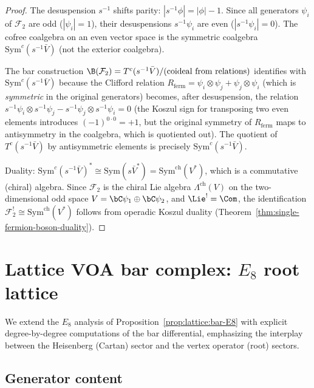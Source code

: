 \begin{proof}
The desuspension $s^{-1}$ shifts parity:
$|s^{-1}\phi| = |\phi| - 1$.  Since all generators $\psi_i$ of
$\mathcal{F}_2$ are odd ($|\psi_i| = 1$), their desuspensions
$s^{-1}\psi_i$ are even ($|s^{-1}\psi_i| = 0$).  The cofree
coalgebra on an even vector space is the symmetric coalgebra
$\mathrm{Sym}^c(s^{-1}\bar{V})$ (not the exterior coalgebra).

The bar construction $\B(\mathcal{F}_2) = T^c(s^{-1}\bar{V})
/\text{(coideal from relations)}$ identifies with
$\mathrm{Sym}^c(s^{-1}\bar{V})$ because the Clifford
relation $R_{\mathrm{ferm}} = \psi_i \otimes \psi_j + \psi_j \otimes \psi_i$
(which is \emph{symmetric} in the original generators) becomes, after
desuspension, the relation $s^{-1}\psi_i \otimes s^{-1}\psi_j
- s^{-1}\psi_j \otimes s^{-1}\psi_i = 0$
(the Koszul sign for transposing two even elements introduces
$(-1)^{0 \cdot 0} = +1$, but the original symmetry of $R_{\mathrm{ferm}}$
maps to antisymmetry in the coalgebra, which is quotiented out).
The quotient of $T^c(s^{-1}\bar{V})$ by antisymmetric elements
is precisely $\mathrm{Sym}^c(s^{-1}\bar{V})$.

Duality: $\mathrm{Sym}^c(s^{-1}\bar{V})^*
\cong \mathrm{Sym}(s\bar{V}^*) = \mathrm{Sym}^{\mathrm{ch}}(V^*)$,
which is a commutative (chiral) algebra.  Since $\mathcal{F}_2$
is the chiral Lie algebra $\Lambda^{\mathrm{ch}}(V)$ on the
two-dimensional odd space $V = \bC\psi_1 \oplus \bC\psi_2$,
and $\Lie^! = \Com$, the identification
$\mathcal{F}_2^! \cong \mathrm{Sym}^{\mathrm{ch}}(V^*)$
follows from operadic Koszul duality
(Theorem~\ref{thm:single-fermion-boson-duality}).
\end{proof}


\section{\texorpdfstring{Lattice VOA bar complex: $E_8$ root lattice}{Lattice VOA bar complex: E8 root lattice}}
\label{sec:E8-lattice-bar}

We extend the $E_8$ analysis of
Proposition~\ref{prop:lattice:bar-E8} with explicit degree-by-degree
computations of the bar differential, emphasizing the interplay between
the Heisenberg (Cartan) sector and the vertex operator (root) sectors.

\subsection{Generator content}

